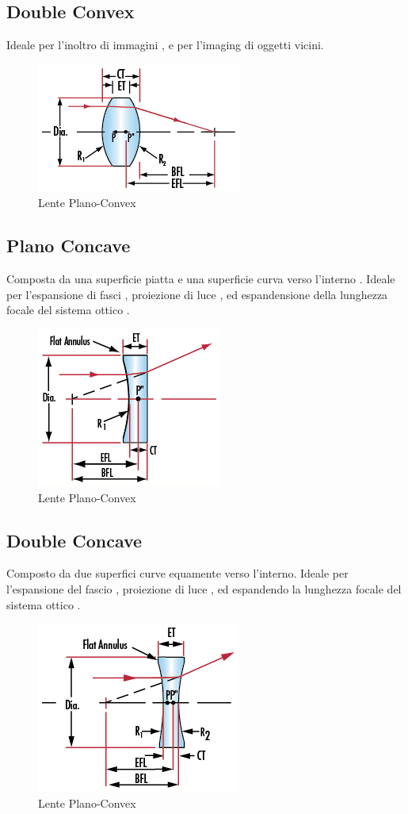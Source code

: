 \subsection{Double Convex}
Ideale per l'inoltro di immagini , e per l'imaging di oggetti vicini.
\begin{figure}[!ht]
\centering

\includegraphics[width=.3\textwidth]{img/double-convex.png}

\caption{Lente Plano-Convex}
\label{fig:ccd-blockdiagram}
\end{figure}

\subsection{Plano Concave}
Composta da una superficie piatta e una superficie curva verso l'interno . Ideale per l'espansione di fasci , proiezione di luce , ed espandensione della lunghezza focale del sistema ottico .

\begin{figure}[!ht]
\centering

\includegraphics[width=.3\textwidth]{img/plano-concave.png}

\caption{Lente Plano-Convex}
\label{fig:ccd-blockdiagram}
\end{figure}


\subsection{Double Concave}
Composto da due superfici curve equamente verso l'interno. Ideale per l'espansione del fascio , proiezione di luce , ed espandendo la lunghezza focale del sistema ottico .
\begin{figure}[!ht]
\centering

\includegraphics[width=.3\textwidth]{img/double-concave.png}

\caption{Lente Plano-Convex}
\label{fig:ccd-blockdiagram}
\end{figure}

